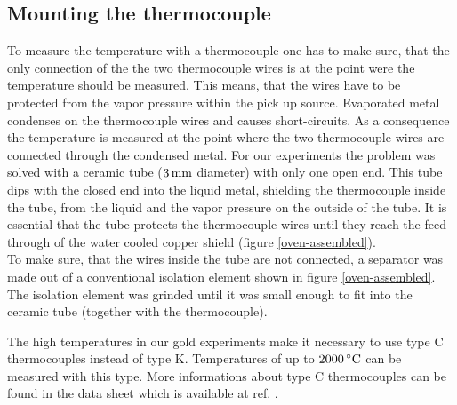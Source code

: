 \documentclass[parskip,12pt,headsepline,a4paper] {scrbook}
\begin{document}
\subsection{Mounting the thermocouple}
\vspace{-1\baselineskip}
To measure the temperature with a thermocouple one has to make sure, that the only connection of the the two thermocouple wires is at the point were the temperature should be measured. This means, that the wires have to be protected from the vapor pressure within the pick up source. Evaporated metal condenses on the thermocouple wires and causes short-circuits. As a consequence the temperature is measured at the point where the two thermocouple wires are connected through the condensed metal. For our experiments the problem was solved with a ceramic tube ($\unit[3]{mm}$ diameter) with only one open end. This tube dips with the closed end into the liquid metal, shielding the thermocouple inside the tube, from the liquid and the vapor pressure on the outside of the tube. It is essential that the tube protects the thermocouple wires until they reach the feed through of the water cooled copper shield (figure \ref{oven-assembled}). \\
To make sure, that the wires inside the tube are not connected, a separator was made out of a conventional isolation element shown in figure \ref{oven-assembled}. The isolation element was grinded until it was small enough to fit into the ceramic tube (together with the thermocouple).

The high temperatures in our gold experiments make it necessary to use type C thermocouples instead of type K. Temperatures of up to $\unit[2000]{^\circ C}$ can be measured with this type. More informations about type C thermocouples can be found in the data sheet which is available at ref. \cite{ref-typec}. \\
\end{document}
